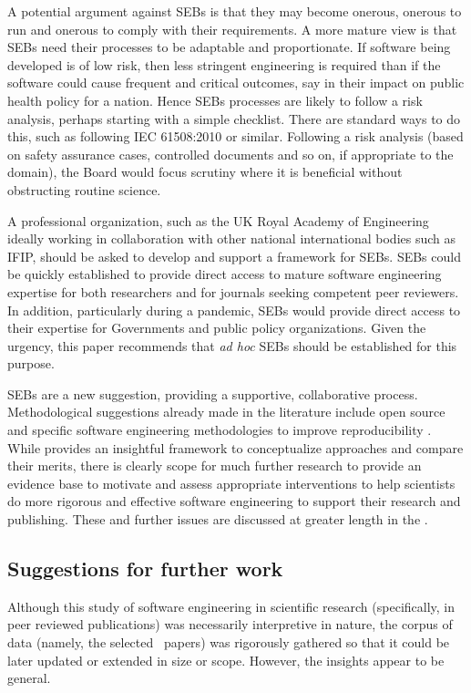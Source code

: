 A potential argument against SEBs is that they may become onerous, onerous to run and onerous to comply with their requirements. A more mature view is that SEBs need their processes to be adaptable and proportionate. If software being developed is of low risk, then less stringent engineering is required than if the software could cause frequent and critical outcomes, say in their impact on public health policy for a nation. Hence SEBs processes are likely to follow a risk analysis, perhaps starting with a simple checklist. {There are standard ways to do this, such as following IEC 61508:2010 \cite{redmill,iec61508} or similar. Following a risk analysis (based on safety assurance cases, controlled documents and so on, if appropriate to the domain), the Board would focus scrutiny where it is beneficial without obstructing routine science.}

A professional organization, such as the UK Royal Academy of Engineering ideally working in collaboration with other national international bodies such as IFIP, should be asked to develop and support a framework for SEBs. SEBs could be quickly established to provide direct access to mature software engineering expertise for both researchers and for journals seeking competent peer reviewers. In addition, particularly during a pandemic, SEBs would provide direct access to their expertise for Governments and public policy organizations. Given the urgency, this paper recommends that \emph{ad hoc\/} SEBs should be established for this purpose.

SEBs are a new suggestion, providing a supportive, collaborative process. Methodological suggestions already made in the literature include open source and specific software engineering methodologies to improve reproducibility \cite{basic-reproducibilty,open-source}. While \cite{ABCs-SE} provides an insightful framework to conceptualize approaches and compare their merits, there is clearly scope for much further research to provide an evidence base to motivate and assess appropriate interventions to help scientists do more rigorous and effective software engineering to support their research and publishing. These and further issues are discussed at greater length in the \supplement. 

\subsection{Suggestions for further work}

Although this study of software engineering in scientific research (specifically, in peer reviewed publications) was necessarily interpretive in nature, the corpus of data (namely, the selected \the\dataN\ papers) was rigorously gathered so that it could be later updated or extended in size or scope. However, the insights appear to be general.

